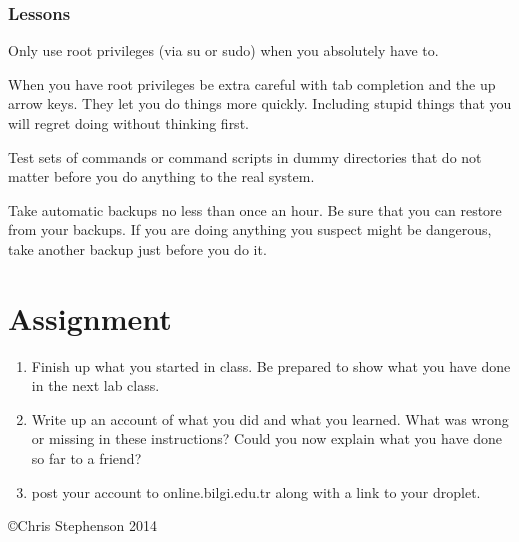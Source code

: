 \documentclass[12pt, a4paper]{article}
\begin{document}
\subsubsection*{Lessons}
Only use root privileges (via su or sudo) when you absolutely have to.

When you have root privileges be extra careful with tab completion and the up arrow keys. They let you do things more quickly. Including stupid things that you will regret doing without thinking first.

Test sets of commands or command scripts in dummy directories that do not matter before you do anything to the real system.

Take automatic backups no less than once an hour. Be sure that you can restore from your backups. If you are doing anything you suspect might be dangerous, take another backup just before you do it.




\section*{Assignment}


\begin{enumerate}
\item Finish up what you started in class. Be prepared to show what you have done in the next lab class. 
\item Write up an account of what you did and what you learned. What was wrong or missing in these instructions? Could you now explain what you have done so far to a friend?
\item post your account to online.bilgi.edu.tr along with a link to your droplet.

\end{enumerate}

\copyright Chris Stephenson 2014
\end{document}
